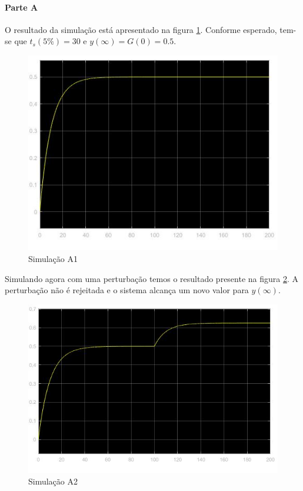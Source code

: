 \documentclass[
]{book}
\theoremstyle{definition}
\theoremstyle{definition}
\theoremstyle{definition}
\theoremstyle{remark}
\begin{document}
\hypertarget{parte-a}{%
\paragraph*{Parte A}\label{parte-a}}

O resultado da simulação está apresentado na figura \ref{fig:prob1A1}. Conforme esperado, tem-se que \(t_s(5\%) = 30\) e \(y(\infty) = G(0) = 0.5\).

\begin{figure}

{\centering \includegraphics[width=0.8\linewidth]{Imagens/Lab5/Resolução/prob1A1} 

}

\caption{Simulação A1}\label{fig:prob1A1}
\end{figure}

Simulando agora com uma perturbação temos o resultado presente na figura \ref{fig:prob1A2}. A perturbação não é rejeitada e o sistema alcança um novo valor para \(y(\infty)\).

\begin{figure}

{\centering \includegraphics[width=0.8\linewidth]{Imagens/Lab5/Resolução/prob1A2} 

}

\caption{Simulação A2}\label{fig:prob1A2}
\end{figure}
\end{document}
